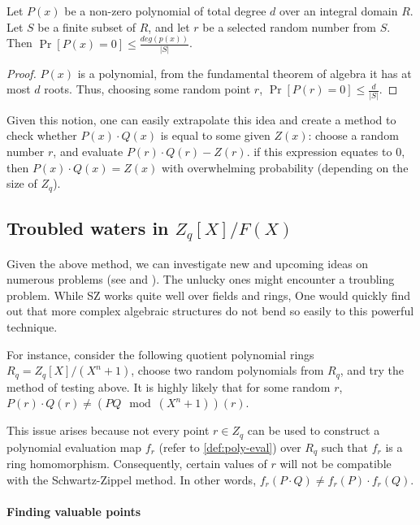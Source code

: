 \begin{theorem}
 Let $P(x)$ be a non-zero polynomial of total degree $d$ over 
 an integral domain $R$. Let $S$ be a finite subset of $R$, and let $r$
 be a selected random number from $S$. Then
  $\Pr [P(x)=0]\le \frac{deg(p(x))}{|S|}$.
\end{theorem}
\begin{proof}
  $P(x)$ is a polynomial, from the fundamental theorem of algebra\cite{Aigner2010} it has 
 at most $d$ roots. Thus, choosing some random point $r$,
  $\Pr [P(r)=0]\le \frac{d}{|S|}$. 
\end{proof}


Given this notion, one can easily extrapolate this idea and create a method 
to check whether $P(x)\cdot Q(x)$ is equal to some given $Z(x)$: 
choose a random number $r$, and evaluate $P(r)\cdot Q(r) - Z(r)$.
if this expression equates to $0$, then $P(x)\cdot Q(x)=Z(x)$ with overwhelming 
probability (depending on the size of $Z_q$).

\subsection{\texorpdfstring{Troubled waters in $Z_q[X]/F(X)$}{Troubled waters in Zq[X]/F(X)}}
Given the above method, we can investigate new and upcoming ideas on numerous
problems (see  \cite{sz-usage2} and ).
The unlucky ones might encounter a troubling problem.
While SZ works quite well over fields and rings,
One would quickly find out that more complex algebraic structures do not 
bend so easily to this powerful technique.

For instance, consider the following quotient polynomial rings $R_q=Z_q[X]/(X^n+1)$,
choose two random polynomials from $R_q$, and try the method of testing above.
It is highly likely that for some random $r$, $P(r)\cdot Q(r) \ne (PQ \mod (X^n+1))(r)$.

This issue arises because not every point $r\in Z_q$ can be used to construct a
polynomial evaluation map $f_r$ (refer to \autoref{def:poly-eval}) 
over $R_q$ such that $f_r$ is a ring homomorphism. 
Consequently, certain values of $r$ will not be compatible with the Schwartz-Zippel method.
In other words, $f_r(P\cdot Q) \neq f_r(P)\cdot f_r(Q)$.


\paragraph{Finding valuable points}

